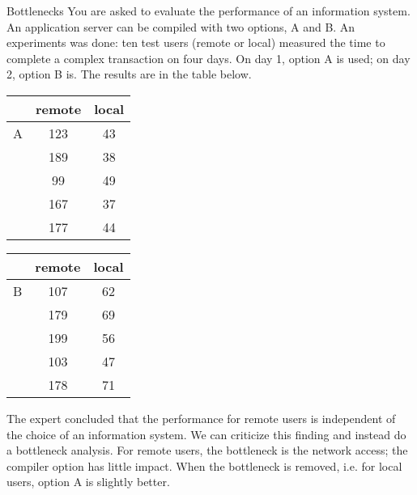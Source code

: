 \begin{ex}{Bottlenecks}
You are asked to evaluate the performance of an
information system. An application server can be
compiled with two options, A and B. An
experiments was done: ten test users (remote or
local) measured the time to complete
   a complex transaction on four days. On day 1, option A is used; on day 2, option B is. The results are
   in the table below.
\begin{center}
\begin{tabular}{|c|c|c|} \hline
    & remote & local \\ \hline
  A & 123 & 43 \\
    & 189  & 38  \\
    & 99  & 49  \\
    & 167  & 37  \\
    & 177  & 44  \\ \hline

\end{tabular}
\begin{tabular}{|c|c|c|} \hline
    & remote & local \\ \hline
    B & 107 & 62 \\ %
    & 179  & 69  \\
    & 199 & 56  \\
    & 103 & 47  \\
    & 178 & 71  \\ \hline
\end{tabular}
\label{metho-tab2}
\end{center}

The expert concluded that the performance for
remote users is independent of the choice of an
information system. We can criticize this finding
and instead do a bottleneck analysis. For remote
users, the bottleneck is the network access; the
compiler option has little impact. When the
bottleneck is removed, i.e. for local users,
option A is slightly better.
\end{ex}

